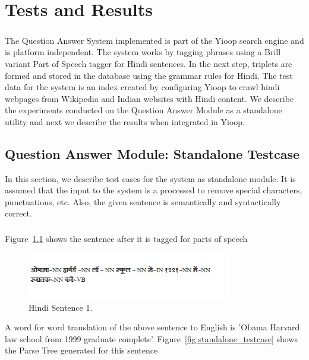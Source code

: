 \chapter{Tests and Results}

\paragraph{}
The Question Answer System implemented is part of the Yioop search engine and is platform independent. The system works by tagging phrases using a Brill variant Part of Speech tagger for Hindi sentences. In the next step, triplets are formed and stored in the database using the grammar rules for Hindi. The test data for the system is an index created by configuring Yioop to crawl hindi webpages from Wikipedia and Indian websites with Hindi content. We describe the experiments conducted on the Question Answer Module as a standalone utility and next we describe the results when integrated in Yioop.

\section {Question Answer Module: Standalone Testcase}
In this section, we describe test cases for the system as standalone module. It is assumed that the input to the system is a processed to remove special characters, punctuations, etc. Also, the given sentence is semantically and syntactically correct.

\paragraph{}
Figure~\ref{fig:sentence_testcase1} shows the sentence after it is tagged for parts of speech

\begin{figure}[htb]
\centering
\includegraphics[width=0.8\textwidth]{images/sentence_testcase1.jpg}
\caption{Hindi Sentence 1.} 
\label{fig:sentence_testcase1}
\end{figure}

A word for word translation of the above sentence to English is 'Obama Harvard law school from 1999 graduate complete'. Figure~\ref{fig:standalone_testcase} shows the Parse Tree generated for this sentence 

